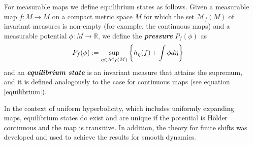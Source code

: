 \documentclass[12pt,a4paper]{amsart}
\theoremstyle{plain}
\begin{document}
For measurable maps we define equilibrium states as follows.
Given a measurable map $f: M \to M$ on a compact metric space $M$ for which the set $\mathcal{M}_{f}(M)$ of invariant measures is non-empty (for example, the continuous maps) and a measurable potential $\phi : M \to \mathbb{R}$, we define the \textbf{\textit{pressure}} $P_{f}(\phi)$ as 
\begin{equation}\label{pressure}
	\displaystyle P_{f}(\phi) : = \sup_{\eta \in \mathcal{M}_{f}(M)} \bigg{\{} h_{\eta}(f) + \int \phi d\eta \bigg{\}}
\end{equation}
and an \textbf{\textit{equilibrium state}} is an invariant measure that attains the supremum, and it is defined analogously to the case for continuous maps (see equation \ref{equilibrium}).

In the context of uniform hyperbolicity, which includes uniformly expanding maps, equilibrium states do exist and are unique if the potential is H\"older continuous
and the map is transitive. In addition, the theory for finite shifts was developed and used to achieve the results for smooth dynamics.
\end{document}
